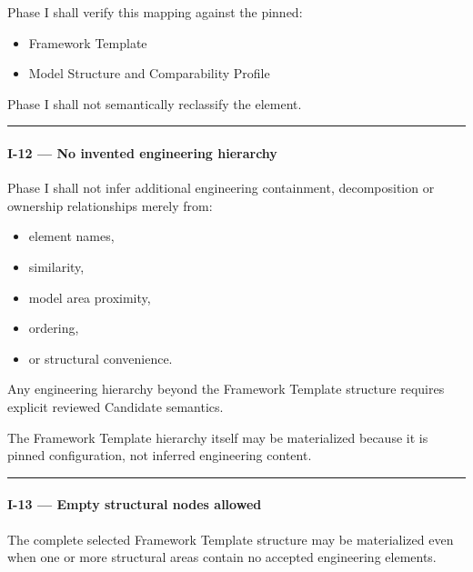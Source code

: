 Phase I shall verify this mapping against the pinned:

\begin{itemize}
\tightlist
\item
  Framework Template
\item
  Model Structure and Comparability Profile
\end{itemize}

Phase I shall not semantically reclassify the element.

\begin{center}\rule{0.5\linewidth}{0.5pt}\end{center}

\hypertarget{i-12--no-invented-engineering-hierarchy}{%
\paragraph{I-12 --- No invented engineering hierarchy}\label{i-12--no-invented-engineering-hierarchy}}

Phase I shall not infer additional engineering containment, decomposition or ownership relationships merely from:

\begin{itemize}
\tightlist
\item
  element names,
\item
  similarity,
\item
  model area proximity,
\item
  ordering,
\item
  or structural convenience.
\end{itemize}

Any engineering hierarchy beyond the Framework Template structure requires explicit reviewed Candidate semantics.

The Framework Template hierarchy itself may be materialized because it is pinned configuration, not inferred engineering content.

\begin{center}\rule{0.5\linewidth}{0.5pt}\end{center}

\hypertarget{i-13--empty-structural-nodes-allowed}{%
\paragraph{I-13 --- Empty structural nodes allowed}\label{i-13--empty-structural-nodes-allowed}}

The complete selected Framework Template structure may be materialized even when one or more structural areas contain no accepted engineering elements.

